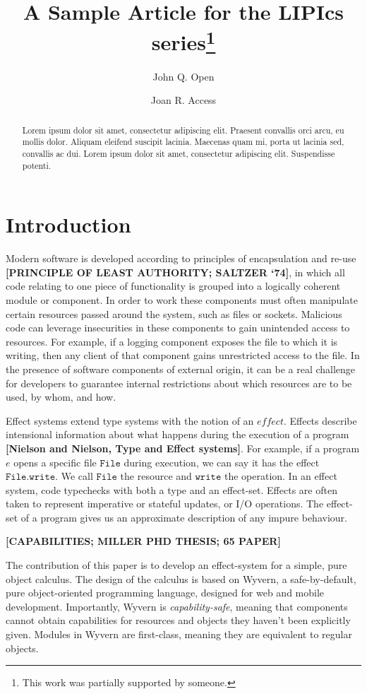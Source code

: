 \documentclass[a4paper,UKenglish]{lipics-v2016}
\title{A Sample Article for the LIPIcs series\footnote{This work was partially supported by someone.}}
\author[1]{John Q. Open}
\author[2]{Joan R. Access}
\affil[1]{Dummy University Computing Laboratory, Address/City, Country\\
  \texttt{open@dummyuniversity.org}}
\affil[2]{Department of Informatics, Dummy College, Address/City, Country\\
  \texttt{access@dummycollege.org}}
\newcommand{\kwa}[1]{\mathtt{ #1 }}
\begin{document}
\maketitle

\begin{abstract}
Lorem ipsum dolor sit amet, consectetur adipiscing elit. Praesent convallis orci arcu, eu mollis dolor. Aliquam eleifend suscipit lacinia. Maecenas quam mi, porta ut lacinia sed, convallis ac dui. Lorem ipsum dolor sit amet, consectetur adipiscing elit. Suspendisse potenti. 
 \end{abstract}

\section{Introduction}

Modern software is developed according to principles of encapsulation and re-use \textbf{[PRINCIPLE OF LEAST AUTHORITY; SALTZER `74]}, in which all code relating to one piece of functionality is grouped into a logically coherent module or component. In order to work these components must often manipulate certain resources passed around the system, such as files or sockets. Malicious code can leverage insecurities in these components to gain unintended access to resources. For example, if a logging component exposes the file to which it is writing, then any client of that component gains unrestricted access to the file. In the presence of software components of external origin, it can be a real challenge for developers to guarantee internal restrictions about which resources are to be used, by whom, and how.

Effect systems extend type systems with the notion of an $\textit{effect}$. Effects describe intensional information about what happens during the execution of a program \textbf{[Nielson and Nielson, Type and Effect systems]}. For example, if a program $e$ opens a specific file $\kwa{File}$ during execution, we can say it has the effect $\kwa{File.write}$. We call $\kwa{File}$ the resource and $\kwa{write}$ the operation. In an effect system, code typechecks with both a type and an effect-set. Effects are often taken to represent imperative or stateful updates, or I/O operations. The effect-set of a program gives us an approximate description of any impure behaviour.

\textbf{[CAPABILITIES; MILLER PHD THESIS; 65 PAPER]}

The contribution of this paper is to develop an effect-system for a simple, pure object calculus. The design of the calculus is based on Wyvern, a safe-by-default, pure object-oriented programming language, designed for web and mobile development. Importantly, Wyvern is \textit{capability-safe}, meaning that components cannot obtain capabilities for resources and objects they haven't been explicitly given. Modules in Wyvern are first-class, meaning they are equivalent to regular objects.
\end{document}
